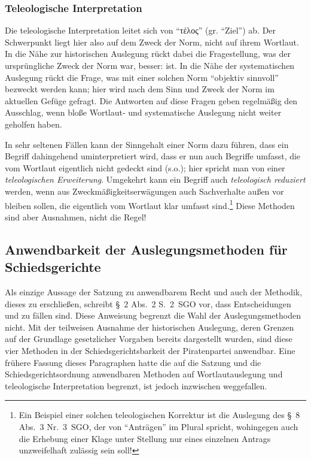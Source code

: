 \subsubsection{Teleologische Interpretation}
Die teleologische Interpretation leitet sich von \enquote{τέλος} (gr. \enquote{Ziel}) ab.
Der Schwerpunkt liegt hier also auf dem Zweck der Norm, nicht auf ihrem Wortlaut.
In die Nähe zur historischen Auslegung rückt dabei die Fragestellung, was der ursprüngliche Zweck der Norm war, besser: ist.
In die Nähe der systematischen Auslegung rückt die Frage, was mit einer solchen Norm \enquote{objektiv sinnvoll} bezweckt werden kann; hier wird nach dem Sinn und Zweck der Norm im aktuellen Gefüge gefragt.
Die Antworten auf diese Fragen geben regelmäßig den Ausschlag, wenn bloße Wortlaut- und systematische Auslegung nicht weiter geholfen haben.

In sehr seltenen Fällen kann der Sinngehalt einer Norm dazu führen, dass ein Begriff dahingehend uminterpretiert wird, dass er nun auch Begriffe umfasst, die vom Wortlaut eigentlich nicht gedeckt sind (s.o.); hier spricht man von einer \emph{teleologischen Erweiterung}.
Umgekehrt kann ein Begriff auch \emph{teleologisch reduziert} werden, wenn aus Zweckmäßigkeitserwägungen auch Sachverhalte außen vor bleiben sollen, die eigentlich vom Wortlaut klar umfasst sind.\footnote{Ein Beispiel einer solchen teleologischen Korrektur ist die Auslegung des \S~8 Abs.~3 Nr.~3~SGO, der von \enquote{Anträgen} im Plural spricht, wohingegen auch die Erhebung einer Klage unter Stellung nur eines einzelnen Antrags unzweifelhaft zulässig sein soll!}
Diese Methoden sind aber Ausnahmen, nicht die Regel!

\subsection{Anwendbarkeit der Auslegungsmethoden für Schiedsgerichte}
Als einzige Aussage der Satzung zu anwendbarem Recht und auch der Methodik, dieses zu erschließen, schreibt \S~2 Abs.~2 S.~2~SGO vor, dass Entscheidungen  und  zu fällen sind.
Diese Anweisung begrenzt die Wahl der Auslegungsmethoden nicht.
Mit der teilweisen Ausnahme der historischen Auslegung, deren Grenzen auf der Grundlage gesetzlicher Vorgaben bereits dargestellt wurden, sind diese vier Methoden in der Schiedsgerichtsbarkeit der Piratenpartei anwendbar.
Eine frühere Fassung dieses Paragraphen hatte die auf die Satzung und die Schiedsgerichtsordnung anwendbaren Methoden auf Wortlautauslegung und teleologische Interpretation begrenzt, ist jedoch inzwischen weggefallen.

